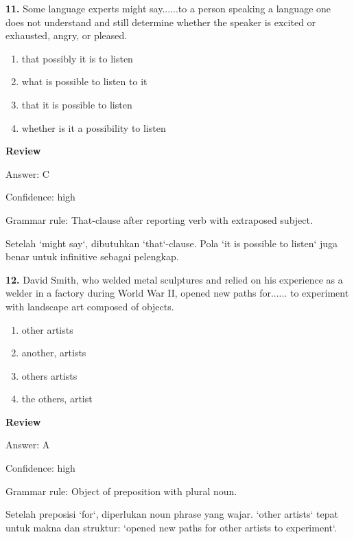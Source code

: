 \documentclass[12pt]{article}
\begin{document}
\endgroup
\par
\vspace{0.25\baselineskip}
\noindent\textbf{11.} Some language experts might say......to a person speaking a language one does not understand and still determine whether the speaker is excited or exhausted, angry, or pleased.
\begin{enumerate}[label=(\Alph*),leftmargin=*,itemsep=0.2em]
\item that possibly it is to listen
\item what is possible to listen to it
\item that it is possible to listen
\item whether is it a possibility to listen
\end{enumerate}
\par
\begingroup
\setlength{\parskip}{0pt}
\setlength{\parindent}{0pt}
\textbf{Review}\par
Answer: C\par
Confidence: high\par
Grammar rule: That-clause after reporting verb with extraposed subject.\par
Setelah `might say`, dibutuhkan `that`-clause. Pola `it is possible to listen` juga benar untuk infinitive sebagai pelengkap.\par
\endgroup
\par
\vspace{0.25\baselineskip}
\noindent\textbf{12.} David Smith, who welded metal sculptures and relied on his experience as a welder in a factory during World War II, opened new paths for...... to experiment with landscape art composed of objects.
\begin{enumerate}[label=(\Alph*),leftmargin=*,itemsep=0.2em]
\item other artists
\item another, artists
\item others artists
\item the others, artist
\end{enumerate}
\par
\begingroup
\setlength{\parskip}{0pt}
\setlength{\parindent}{0pt}
\textbf{Review}\par
Answer: A\par
Confidence: high\par
Grammar rule: Object of preposition with plural noun.\par
Setelah preposisi `for`, diperlukan noun phrase yang wajar. `other artists` tepat untuk makna dan struktur: `opened new paths for other artists to experiment`.\par
\end{document}
